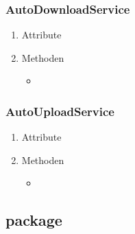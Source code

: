 \documentclass[a4paper]{scrreprt}
\begin{document}
                \subsubsection{AutoDownloadService}
                    \begin{enumerate}
                        \item Attribute
                        \item Methoden
                            \begin{itemize}
                                \item {}
                            \end{itemize}
                    \end{enumerate}

                \subsubsection{AutoUploadService}
                    \begin{enumerate}
                        \item Attribute
                        \item Methoden
                            \begin{itemize}
                                \item {}
                            \end{itemize}
                    \end{enumerate}

            \newpage
            \subsection{package }
\end{document}
